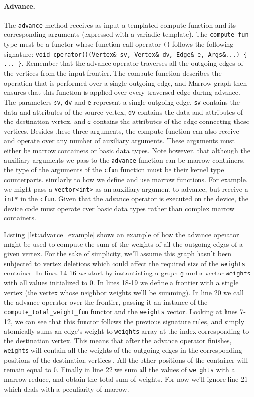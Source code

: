 \paragraph{\textbf{Advance}.}
The \texttt{advance} method receives as input a templated compute function and its corresponding arguments (expressed with a variadic template). The \texttt{compute\_fun} type must be a functor whose function call operator \texttt{()} follows the following signature: \texttt{void operator()(Vertex\& sv, Vertex\& dv, Edge\& e, Args\&...) \{ ... \}}. Remember that the advance operator traverses all the outgoing edges of the vertices from the input frontier. The compute function describes the operation that is performed over a single outgoing edge, and Marrow-graph then ensures that this function is applied over every traversed edge during advance. The parameters \texttt{sv}, \texttt{dv} and \texttt{e} represent a single outgoing edge. \texttt{sv} contains the data and attributes of the source vertex, \texttt{dv} contains the data and attributes of the destination vertex, and \texttt{e} contains the attributes of the edge connecting these vertices. Besides these three arguments, the compute function can also receive and operate over any number of auxiliary arguments. These arguments must either be marrow containers or basic data types. Note however, that although the auxiliary arguments we pass to the \texttt{advance} function can be marrow containers, the type of the arguments of the \texttt{cfun} function must be their kernel type counterparts, similarly to how we define and use marrow functions. For example, we might pass a \texttt{vector<int>} as an auxiliary argument to advance, but receive a \texttt{int*} in the \texttt{cfun}. Given that the advance operator is executed on the device, the device code must operate over basic data types rather than complex marrow containers.

Listing~\ref{lst:advance_example} shows an example of how the advance operator might be used to compute the sum of the weights of all the outgoing edges of a given vertex. For the sake of simplicity, we'll assume this graph hasn't been subjected to vertex deletions which could affect the required size of the \texttt{weights} container. In lines 14-16 we start by instantiating a graph \texttt{g} and a vector \texttt{weights} with all values initialized to 0. In lines 18-19 we define a frontier with a single vertex (the vertex whose neighbor weights we'll be summing). In line 20 we call the advance operator over the frontier, passing it an instance of the \texttt{compute\_total\_weight\_fun} functor and the \texttt{weights} vector. Looking at lines 7-12, we can see that this functor follows the previous signature rules, and simply atomically sums an edge's weight to \texttt{weights} array at the index corresponding to the destination vertex. This means that after the advance operator finishes, \texttt{weights} will contain all the weights of the outgoing edges in the corresponding positions of the destination vertices . All the other positions of the container will remain equal to 0. Finally in line 22 we sum all the values of \texttt{weights} with a marrow reduce, and obtain the total sum of weights. For now we'll ignore line 21 which deals with a peculiarity of marrow.

